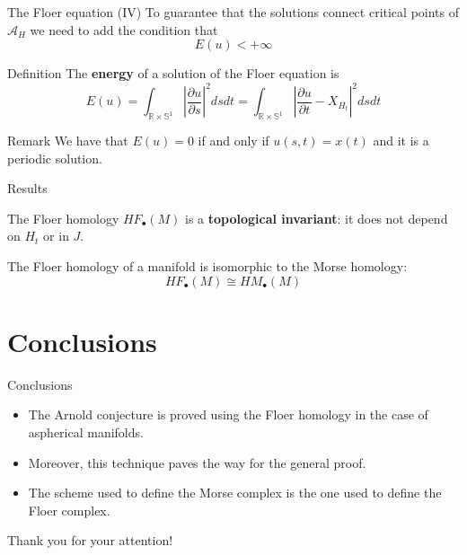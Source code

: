 \documentclass{beamer}
\newcommand{\con}[1]{\mathbb{#1}}
\newcommand{\R}{\con{R}}
\begin{document}
\begin{frame}{The Floer equation (IV)}
	To guarantee that the solutions connect critical points of $\mathcal{A}_H$ we need to add the condition that
	\[E(u) < + \infty\]

	\begin{block}{Definition}
		The {\bf energy} of a solution of the Floer equation is
		\[E(u) = \int_{\R \times \con{S}^1} \left| \frac{\partial u}{\partial s} \right|^2 dsdt = \int_{\R \times \con{S}^1} \left| \frac{\partial u}{\partial t} - X_{H_t} \right|^2 dsdt\]
	\end{block}

	\begin{block}{Remark}
		We have that $E(u) = 0$ if and only if $u(s,t) = x(t)$ and it is a periodic solution.
	\end{block}
\end{frame}

\begin{frame}{Results}
	\begin{theorem}
		The Floer homology $HF_{\bullet}(M)$ is a {\bf topological invariant}: it does not depend on $H_t$ or in $J$.
	\end{theorem}

	\begin{theorem}
		The Floer homology of a manifold is isomorphic to the Morse homology:
		\[HF_{\bullet}(M) \cong HM_{\bullet}(M)\]
	\end{theorem}
\end{frame}

\section{Conclusions}

\begin{frame}{Conclusions}
	\begin{itemize}
		\item The Arnold conjecture is proved using the Floer homology in the case of aspherical manifolds.
		\item Moreover, this technique paves the way for the general proof.
		\item The scheme used to define the Morse complex is the one used to define the Floer complex.
	\end{itemize}
\end{frame}

\begin{frame}
	\begin{center}
		\huge Thank you for your attention!
	\end{center}
\end{frame}
\end{document}
